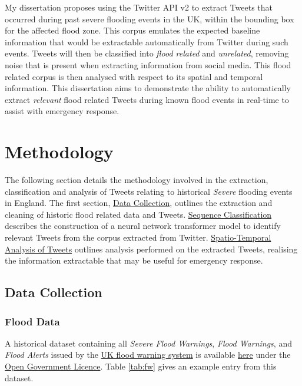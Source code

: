 \documentclass[a4paper, notitlepage]{extreport}
\begin{document}
My dissertation proposes using the Twitter API v2 to extract Tweets that
occurred during past severe flooding events in the UK, within the
bounding box for the affected flood zone. This corpus emulates the
expected baseline information that would be extractable automatically
from Twitter during such events. Tweets will then be classified into
\emph{flood related} and \emph{unrelated}, removing noise that is
present when extracting information from social media. This flood
related corpus is then analysed with respect to its spatial and temporal
information. This dissertation aims to demonstrate the ability to
automatically extract \emph{relevant} flood related Tweets during known
flood events in real-time to assist with emergency response.

\chapter{Methodology}

The following section details the methodology involved in the
extraction, classification and analysis of Tweets relating to historical
\emph{Severe} flooding events in England. The first section,
\protect\hyperlink{data-collection}{Data Collection}, outlines the
extraction and cleaning of historic flood related data and Tweets.
\protect\hyperlink{sequence-classification}{Sequence Classification}
describes the construction of a neural network transformer model to
identify relevant Tweets from the corpus extracted from Twitter.
\protect\hyperlink{spatial-temporal-analysis-of-tweets}{Spatio-Temporal
Analysis of Tweets} outlines analysis performed on the extracted Tweets,
realising the information extractable that may be useful for emergency
response.

\hypertarget{data-collection}{%
\section{Data Collection}\label{data-collection}}

\hypertarget{flood-data}{%
\subsection{Flood Data}\label{flood-data}}

A historical dataset containing all \emph{Severe Flood Warnings},
\emph{Flood Warnings}, and \emph{Flood Alerts} issued by the
\href{https://flood-warning-information.service.gov.uk/warnings}{UK
flood warning system} is available
\href{https://data.gov.uk/dataset/d4fb2591-f4dd-4e7f-9aaf-49af94437b36/historic-flood-warnings}{here}
under the
\href{http://www.nationalarchives.gov.uk/doc/open-government-licence/version/3/}{Open
Government Licence}. Table \ref{tab:fw} gives an example entry from this
dataset.
\end{document}
